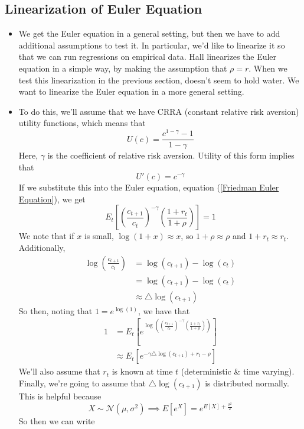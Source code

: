 \documentclass[12pt]{article}
\begin{document}
\subsection{Linearization of Euler Equation}

\begin{itemize}
    \item We get the Euler equation in a general setting, but then we have to add additional assumptions to test it. In particular, we'd like to linearize it so that we can run regressions on empirical data. Hall linearizes the Euler equation in a simple way, by making the assumption that $\rho = r$. When we test this linearization in the previous section, doesn't seem to hold water. We want to linearize the Euler equation in a more general setting. 
    \item To do this, we'll assume that we have CRRA (constant relative risk aversion) utility functions, which means that 
    \[U(c) = \frac{c^{1-\gamma}-1}{1-\gamma}\]
    Here, $\gamma$ is the coefficient of relative risk aversion. Utility of this form implies that
    \[U'(c) = c^{-\gamma}\]
    If we substitute this into the Euler equation, equation (\ref{Friedman Euler Equation}), we get
    \[E_t\left[\left(\frac{c_{t+1}}{c_t}\right)^{-\gamma}\left(\frac{1+r_t}{1+\rho}\right)\right] = 1\]
    We note that if $x$ is small, $\log(1+x) \approx x$, so $1 + \rho \approx \rho$ and $1 + r_t \approx r_t$. Additionally,
    \[\begin{split}
        \log\left(\frac{c_{t+1}}{c_t}\right) &= \log(c_{t+1}) - \log(c_t) \\
        &= \log(c_{t+1}) - \log(c_t) \\
        &\approx \triangle \log(c_{t+1})
    \end{split}\]
    So then, noting that $1 = e^{\log(1)}$, we have that
    \[\begin{split}
        1 &= E_t\left[e^{\log\left(\left(\frac{c_{t+1}}{c_t}\right)^{-\gamma}\left(\frac{1+r_t}{1+\rho}\right)\right)}\right] \\
        &\approx E_t\left[e^{-\gamma \triangle \log(c_{t+1}) + r_t - \rho}\right]
    \end{split}\]
    We'll also assume that $r_t$ is known at time $t$ (deterministic \& time varying). Finally, we're going to assume that $\triangle \log(c_{t+1})$ is distributed normally. This is helpful because
    \[X\sim \mathcal{N}(\mu, \sigma^2) \implies E[e^X] = e^{E[X] + \frac{\sigma^2}{2}}\]
    So then we can write
    \[\begin{split}

\end{split}\]
\end{itemize}
\end{document}
